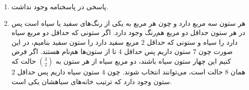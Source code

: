 \p
\begin{enumerate}
\item
پاسخی در پاسخنامه وجود نداشت.
\item
هر ستون سه مربع دارد و چون هر مربع به یکی از رنگ‌های سفید یا سیاه است پس در هر ستون حداقل دو مربع هم‌رنگ وجود دارد. اگر ستونی که حداقل دو مربع سیاه دارد را سیاه و ستونی که حداقل
$2$
مربع سفید دارد را ستون سفید بنامیم، در این صورت چون
$7$
ستون داریم پس حداقل
$4$
تا از ستون‌ها هم‌نام هستند. اگر فرض کنیم این چهار ستون سیاه باشند، دو مربع سیاه از هر ستون به
$\binom3 2$
حالت که همان
$8$
حالت است، می‌توانند انتخاب شوند. چون
$4$
ستون سیاه داریم پس حداقل
$2$
ستون وجود دارد که ترتیب خانه‌های سیاهشان یکی است.

\end{enumerate}



